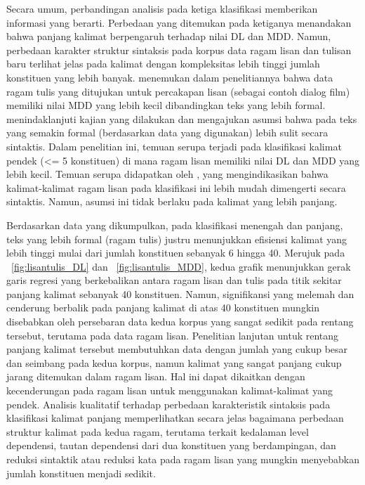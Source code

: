 Secara umum, perbandingan analisis pada ketiga klasifikasi memberikan informasi yang berarti. Perbedaan yang ditemukan pada ketiganya menandakan bahwa panjang kalimat berpengaruh terhadap nilai DL dan MDD. Namun, perbedaan karakter struktur sintaksis pada korpus data ragam lisan dan tulisan baru terlihat jelas pada kalimat dengan kompleksitas lebih tinggi jumlah konstituen yang lebih banyak. \cite{wang2017effects} menemukan dalam penelitiannya bahwa data ragam tulis yang ditujukan untuk percakapan lisan (sebagai contoh dialog film) memiliki nilai MDD yang lebih kecil dibandingkan teks yang lebih formal. \cite{wang2017effects} menindaklanjuti kajian yang dilakukan \cite{hiranuma1999syntactic} dan \cite{liu2009chinese} mengajukan asumsi bahwa pada teks yang semakin formal (berdasarkan data yang digunakan) lebih sulit secara sintaktis. Dalam penelitian ini, temuan serupa terjadi pada klasifikasi kalimat pendek (\textless= 5 konstituen) di mana ragam lisan memiliki nilai DL dan MDD yang lebih kecil. Temuan serupa didapatkan oleh \cite{wang2017effects}, yang mengindikasikan bahwa kalimat-kalimat ragam lisan pada klasifikasi ini lebih mudah dimengerti secara sintaktis. Namun, asumsi ini tidak berlaku pada kalimat yang lebih panjang. 

Berdasarkan data yang dikumpulkan, pada klasifikasi menengah dan panjang, teks yang lebih formal (ragam tulis) justru menunjukkan efisiensi kalimat yang lebih tinggi mulai dari jumlah konstituen sebanyak 6 hingga 40. Merujuk pada \pic~\ref{fig:lisantulis_DL} dan \pic~\ref{fig:lisantulis_MDD}, kedua grafik menunjukkan gerak garis regresi yang berkebalikan antara ragam lisan dan tulis pada titik sekitar panjang kalimat sebanyak 40 konstituen. Namun, signifikansi yang melemah dan cenderung berbalik pada panjang kalimat di atas 40 konstituen mungkin disebabkan oleh persebaran data kedua korpus yang sangat sedikit pada rentang tersebut, terutama pada data ragam lisan. Penelitian lanjutan untuk rentang panjang kalimat tersebut membutuhkan data dengan jumlah yang cukup besar dan seimbang pada kedua korpus, namun kalimat yang sangat panjang cukup jarang ditemukan dalam ragam lisan. Hal ini dapat dikaitkan dengan kecenderungan pada ragam lisan untuk menggunakan kalimat-kalimat yang pendek. Analisis kualitatif terhadap perbedaan karakteristik sintaksis pada klasifikasi kalimat panjang memperlihatkan secara jelas bagaimana perbedaan struktur kalimat pada kedua ragam, terutama terkait kedalaman level dependensi, tautan dependensi dari dua konstituen yang berdampingan, dan reduksi sintaktik atau reduksi kata pada ragam lisan yang mungkin menyebabkan jumlah konstituen menjadi sedikit.

